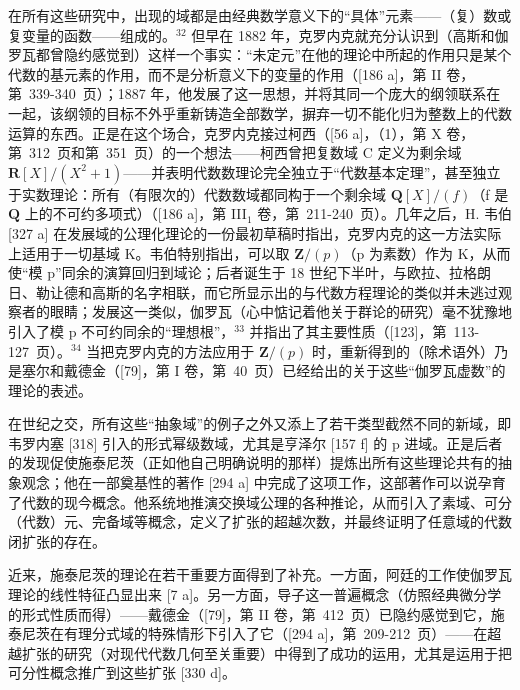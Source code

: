 在所有这些研究中，出现的域都是由经典数学意义下的“具体”元素——（复）数或复变量的函数——组成的。\(^{32}\) 但早在 1882 年，克罗内克就充分认识到（高斯和伽罗瓦都曾隐约感觉到）这样一个事实：“未定元”在他的理论中所起的作用只是某个代数的基元素的作用，而不是分析意义下的变量的作用（{[}186 a{]}，第 II 卷，第~339-340~页）；1887 年，他发展了这一思想，并将其同一个庞大的纲领联系在一起，该纲领的目标不外乎重新铸造全部数学，摒弃一切不能化归为整数上的代数运算的东西。正是在这个场合，克罗内克接过柯西（{[}56 a{]}，（1），第 X 卷，第~312~页和第~351~页）的一个想法——柯西曾把复数域 C 定义为剩余域 \(\mathbf{R}[X]/(X^{2}+1)\)——并表明代数数理论完全独立于“代数基本定理”，甚至独立于实数理论：所有（有限次的）代数数域都同构于一个剩余域 \(\mathbf{Q}[X]/(f)\)（f 是 \(\mathbf{Q}\) 上的不可约多项式）（{[}186 a{]}，第 III\(_{1}\) 卷，第~211-240~页）。几年之后，H. 韦伯 {[}327 a{]} 在发展域的公理化理论的一份最初草稿时指出，克罗内克的这一方法实际上适用于一切基域 K。韦伯特别指出，可以取 \(\mathbf{Z}/(p)\)（p 为素数）作为 K，从而使“模 p”同余的演算回归到域论；后者诞生于 18 世纪下半叶，与欧拉、拉格朗日、勒让德和高斯的名字相联，而它所显示出的与代数方程理论的类似并未逃过观察者的眼睛；发展这一类似，伽罗瓦（心中惦记着他关于群论的研究）毫不犹豫地引入了模 p 不可约同余的“理想根”，\(^{33}\) 并指出了其主要性质（{[}123{]}，第~113-127~页）。\(^{34}\) 当把克罗内克的方法应用于 \(\mathbf{Z}/(p)\) 时，重新得到的（除术语外）乃是塞尔和戴德金（{[}79{]}，第 I 卷，第~40~页）已经给出的关于这些“伽罗瓦虚数”的理论的表述。

在世纪之交，所有这些“抽象域”的例子之外又添上了若干类型截然不同的新域，即韦罗内塞 {[}318{]} 引入的形式幂级数域，尤其是亨泽尔 {[}157 f{]} 的 p 进域。正是后者的发现促使施泰尼茨（正如他自己明确说明的那样）提炼出所有这些理论共有的抽象观念；他在一部奠基性的著作 {[}294 a{]} 中完成了这项工作，这部著作可以说孕育了代数的现今概念。他系统地推演交换域公理的各种推论，从而引入了素域、可分（代数）元、完备域等概念，定义了扩张的超越次数，并最终证明了任意域的代数闭扩张的存在。

近来，施泰尼茨的理论在若干重要方面得到了补充。一方面，阿廷的工作使伽罗瓦理论的线性特征凸显出来 {[}7 a{]}。另一方面，导子这一普遍概念（仿照经典微分学的形式性质而得）——戴德金（{[}79{]}，第 II 卷，第~412~页）已隐约感觉到它，施泰尼茨在有理分式域的特殊情形下引入了它（{[}294 a{]}，第~209-212~页）——在超越扩张的研究（对现代代数几何至关重要）中得到了成功的运用，尤其是运用于把可分性概念推广到这些扩张 {[}330 d{]}。

